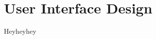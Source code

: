 \documentclass[../../dd.tex]{subfiles}
\begin{document}
	\chapter{User Interface Design}

	Heyheyhey
\end{document}
